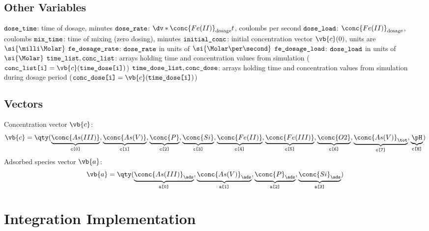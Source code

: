 \documentclass[11pt]{scrartcl} %
\begin{document}
        \subsection{Other Variables}
        \begin{multicols}{2}
            \begin{itemize}
                \ii $\verb|dose_time|$: time of dosage, minutes
                \ii $\verb|dose_rate|$: $\dv*{\conc{Fe (II)}_{\mathrm{dosage}}}{t}$, coulombs per second
                \ii $\verb|dose_load|$: $\conc{Fe (II)}_{\mathrm{dosage}}$, coulombs
                \ii $\verb|mix_time|$: time of mixing (zero dosing), minutes
                \ii $\verb|initial_conc|$: initial concentration vector $\vb{c}(0)$, units are $\si{\milli\Molar}$
                \ii $\verb|fe_dosage_rate|$: $\verb|dose_rate|$ in units of $\si{\Molar\per\second}$
                \ii $\verb|fe_dosage_load|$: $\verb|dose_load|$ in units of $\si{\Molar}$
                \ii $\verb|time_list|, \verb|conc_list|$: arrays holding time and concentration values from simulation ($\verb|conc_list[i]| = \vb{c}(\verb|time_dose[i]|)$)
                \ii $\verb|time_dose_list|, \verb|conc_dose|$: arrays holding time and concentration values from simulation during dosage period ($\verb|conc_dose[i]| = \vb{c}(\verb|time_dose[i]|)$)
            \end{itemize}
        \end{multicols}

        \subsection{Vectors}

        \begin{itemize}
            \ii Concentration vector $\vb{c}$:
            \[\vb{c} = \qty(\underbrace{\conc{As (III)}}_{\texttt{c[0]}}, \underbrace{\conc{As (V)}}_{\texttt{c[1]}}, \underbrace{\conc{P}}_{\texttt{c[2]}}, \underbrace{\conc{Si}}_{\texttt{c[3]}}, \underbrace{\conc{Fe (II)}}_{\texttt{c[4]}}, \underbrace{\conc{Fe (III)}}_{\texttt{c[5]}}, \underbrace{\conc{O2}}_{\texttt{c[6]}}, \underbrace{\conc{As (V)}_\tot}_{\texttt{c[7]}}, \underbrace{\pH}_{\texttt{c[8]}})\]
            \ii Adsorbed species vector $\vb{a}$:
            \[\vb{a} = \qty(\underbrace{\conc{As (III)}_\ads}_{\texttt{a[0]}}, \underbrace{\conc{As (V)}_\ads}_{\texttt{a[1]}}, \underbrace{\conc{P}_\ads}_{\texttt{a[2]}}, \underbrace{\conc{Si}_\ads}_{\texttt{a[3]}})\]
        \end{itemize}
    \section{Integration Implementation}
\end{document}
